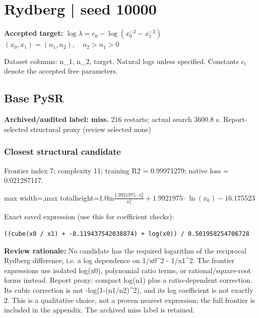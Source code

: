 \documentclass[10pt,letterpaper,landscape]{article}
\begin{document}
\section*{Rydberg | seed 10000}
\textbf{Accepted target:} $\displaystyle \log\lambda=c_0-\log\!\left(x_0^{-2}-x_1^{-2}\right)$\hfill $(x_0,x_1)=(n_1,n_2),\quad n_2>n_1>0$\par
{\small Dataset columns: n\_1, n\_2, target. Natural logs unless specified. Constants $c_i$ denote the accepted free parameters.}\par\medskip
\begin{minipage}[t]{0.485\textwidth}
\subsection*{Base PySR}
\textbf{Archived/audited label: miss.} 216 restarts; actual search 3600.8 s.
{\small Report-selected structural proxy (review selected none)}
\subsubsection*{Closest structural candidate}
Frontier index 7; complexity 11; training R2 = 0.99971279; native loss = 0.021287117.
\begin{center}\begin{adjustbox}{max width=\linewidth,max totalheight=1.0in}$\displaystyle \frac{1.9921975 \cdot x_{0}^{3}}{x_{1}^{3}} + 1.9921975 \cdot \ln{\left(x_{0} \right)} - 16.175523$\end{adjustbox}\end{center}
{\scriptsize Exact saved expression (use this for coefficient checks):}
\begin{lstlisting}
((cube(x0 / x1) + -8.119437542038874) + log(x0)) / 0.501958254706728
\end{lstlisting}
{\small\textbf{Review rationale:} No candidate has the required logarithm of the reciprocal Rydberg difference, i.e. a log dependence on 1/x0\textasciicircum{}2 - 1/x1\textasciicircum{}2. The frontier expressions use isolated log(x0), polynomial ratio terms, or rational/square-root forms instead. Report proxy: compact log(n1) plus a ratio-dependent correction. Its cubic correction is not -log(1-(n1/n2)\textasciicircum{}2), and its log coefficient is not exactly 2. This is a qualitative choice, not a proven nearest expression; the full frontier is included in the appendix. The archived miss label is retained.}

\end{minipage}
\end{document}
